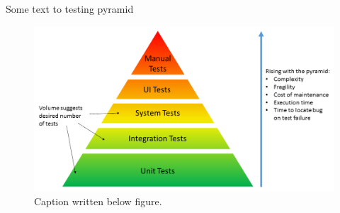 Some text to testing pyramid

\begin{figure}[H]
    \centering
    \includegraphics[width=1\textwidth]{Images/test_pyramid.png}
    \caption[Testing Pyramide]{Caption written below figure.}
    \label{fig:flow around cylinder}
\end{figure}
